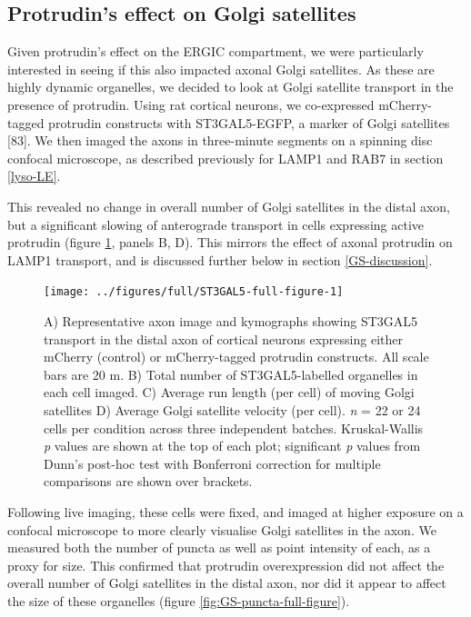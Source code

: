 \documentclass[
  12pt,
  a4paper,
]{book}
\begin{document}
\hypertarget{protrudins-effect-on-golgi-satellites}{%
\subsection{Protrudin's effect on Golgi satellites}\label{protrudins-effect-on-golgi-satellites}}

Given protrudin's effect on the ERGIC compartment, we were particularly interested in seeing if this also impacted axonal Golgi satellites. As these are highly dynamic organelles, we decided to look at Golgi satellite transport in the presence of protrudin. Using rat cortical neurons, we co-expressed mCherry-tagged protrudin constructs with ST3GAL5-EGFP, a marker of Golgi satellites {[}83{]}. We then imaged the axons in three-minute segments on a spinning disc confocal microscope, as described previously for LAMP1 and RAB7 in section \ref{lyso-LE}.

This revealed no change in overall number of Golgi satellites in the distal axon, but a significant slowing of anterograde transport in cells expressing active protrudin (figure \ref{fig:ST3GAL5-full-figure}, panels B, D). This mirrors the effect of axonal protrudin on LAMP1 transport, and is discussed further below in section \ref{GS-discussion}.



\begin{figure}
\texttt{[image: ../figures/full/ST3GAL5-full-figure-1]} \caption[Protrudin effect on Golgi satellite (ST3GAL5) transport in the distal axon]{A) Representative axon image and kymographs showing ST3GAL5 transport in the distal axon of cortical neurons expressing either mCherry (control) or mCherry-tagged protrudin constructs. All scale bars are 20 \textmu{}m. B) Total number of ST3GAL5-labelled organelles in each cell imaged. C) Average run length (per cell) of moving Golgi satellites D) Average Golgi satellite velocity (per cell). \emph{n} = 22 or 24 cells per condition across three independent batches. Kruskal-Wallis \emph{p} values are shown at the top of each plot; significant \emph{p} values from Dunn's post-hoc test with Bonferroni correction for multiple comparisons are shown over brackets.}\label{fig:ST3GAL5-full-figure}
\end{figure}

Following live imaging, these cells were fixed, and imaged at higher exposure on a confocal microscope to more clearly visualise Golgi satellites in the axon. We measured both the number of puncta as well as point intensity of each, as a proxy for size. This confirmed that protrudin overexpression did not affect the overall number of Golgi satellites in the distal axon, nor did it appear to affect the size of these organelles (figure \ref{fig:GS-puncta-full-figure}).
\end{document}
